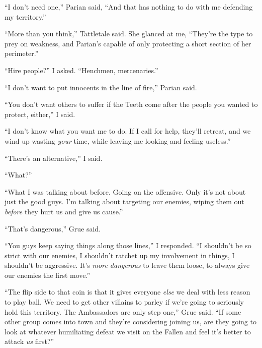 ``I don't need one,'' Parian said, ``And that has nothing to do with me defending my territory.''



``More than you think,'' Tattletale said.  She glanced at me, ``They're the type to prey on weakness, and Parian's capable of only protecting a short section of her perimeter.''



``Hire people?'' I asked.  ``Henchmen, mercenaries.''



``I don't want to put innocents in the line of fire,'' Parian said.



``You don't want others to suffer if the Teeth come after the people you wanted to protect, either,'' I said.



``I don't know what you want me to do.  If I call for help, they'll retreat, and we wind up wasting \emph{your} time, while leaving me looking and feeling useless.''



``There's an alternative,'' I said.



``What?''



``What I was talking about before.  Going on the offensive.  Only it's not about just the good guys.  I'm talking about targeting our enemies, wiping them out \emph{before} they hurt us and give us cause.''



``That's dangerous,'' Grue said.



``You guys keep saying things along those lines,'' I responded.  ``I shouldn't be so strict with our enemies, I shouldn't ratchet up my involvement in things, I shouldn't be aggressive.  It's \emph{more dangerous} to leave them loose, to always give our enemies the first move.''



``The flip side to that coin is that it gives everyone \emph{else} we deal with less reason to play ball.  We need to get other villains to parley if we're going to seriously hold this territory.  The Ambassadors are only step one,'' Grue said.  ``If some other group comes into town and they're considering joining us, are they going to look at whatever humiliating defeat we visit on the Fallen and feel it's better to attack \emph{us} first?''




